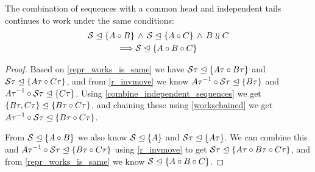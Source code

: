 \begin{mylem}\label{indep_prefix_combine}
The combination of sequences with a common head and independent tails 
continues to work under the same conditions:
\begin{gather*}
 {\mathcal{S}}\trianglelefteq{\{{A\circ B}\}} \,\wedge\, {\mathcal{S}}\trianglelefteq{\{{A\circ C}\}} \,\wedge\, B\mathrel{\wr\wr} C \\
 \Longrightarrow {\mathcal{S}}\trianglelefteq{\{{A\circ B\circ C}\}}
\end{gather*}
\end{mylem}
\begin{proof}
Based on \cref{repr_works_is_same} we have
${\mathcal{S}\tau}\trianglelefteq{\{{A\tau\circ B\tau}\}}$ and ${\mathcal{S}\tau}\trianglelefteq{\{{A\tau\circ C\tau}\}}$,
and from \cref{r_invmove} we know
${{A\tau}^{-1}\circ \mathcal{S\tau}}\trianglelefteq{\{{B\tau}\}}$ 
and ${{A\tau}^{-1}\circ \mathcal{S\tau}}\trianglelefteq{\{{C\tau}\}}$.
Using \cref{combine_independent_sequences} we get
${\{{B\tau,C\tau}\}}\trianglelefteq{\{{B\tau\circ C\tau}\}}$,
and chaining these using \cref{workschained}
we get
${{A\tau}^{-1}\circ \mathcal{S}\tau}\trianglelefteq{\{{B\tau\circ C\tau}\}}$.

From ${\mathcal{S}}\trianglelefteq{\{{A\circ B}\}}$ we also know ${\mathcal{S}}\trianglelefteq{\{{A}\}}$ and ${\mathcal{S}\tau}\trianglelefteq{\{{A\tau}\}}$.
We can combine this and ${{A\tau}^{-1}\circ \mathcal{S}\tau}\trianglelefteq{\{{B\tau\circ C\tau}\}}$ using
\cref{r_invmove} to get
${\mathcal{S}\tau}\trianglelefteq{\{{A\tau\circ B\tau\circ C\tau}\}}$, and from \cref{repr_works_is_same} we know
${\mathcal{S}}\trianglelefteq{\{{A\circ B\circ C}\}}$.
\end{proof}
